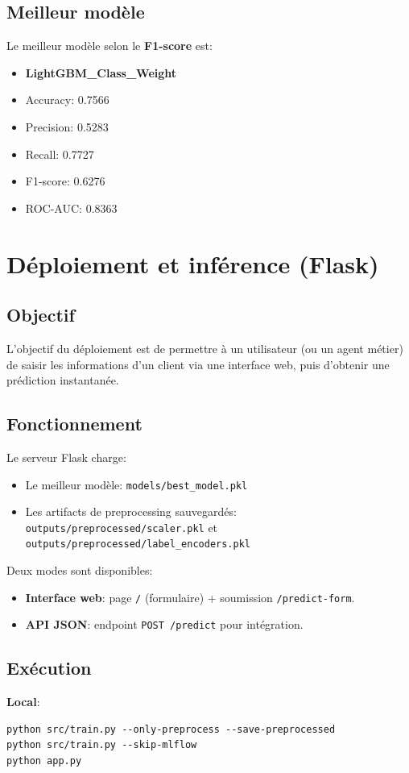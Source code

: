\documentclass[11pt,a4paper]{article}
\begin{document}
\subsection{Meilleur mod\`ele}
Le meilleur mod\`ele selon le \textbf{F1-score} est:
\begin{itemize}
  \item \textbf{LightGBM\_Class\_Weight}
  \item Accuracy: 0.7566
  \item Precision: 0.5283
  \item Recall: 0.7727
  \item F1-score: 0.6276
  \item ROC-AUC: 0.8363
\end{itemize}

\section{D\'eploiement et inf\'erence (Flask)}
\subsection{Objectif}
L'objectif du d\'eploiement est de permettre \`a un utilisateur (ou un agent m\'etier) de saisir les informations d'un client via une interface web, puis d'obtenir une pr\'ediction instantan\'ee.

\subsection{Fonctionnement}
Le serveur Flask charge:
\begin{itemize}
  \item Le meilleur mod\`ele: \texttt{models/best\_model.pkl}
  \item Les artifacts de preprocessing sauvegard\'es: \texttt{outputs/preprocessed/scaler.pkl} et \texttt{outputs/preprocessed/label\_encoders.pkl}
\end{itemize}

Deux modes sont disponibles:
\begin{itemize}
  \item \textbf{Interface web}: page \texttt{/} (formulaire) + soumission \texttt{/predict-form}.
  \item \textbf{API JSON}: endpoint \texttt{POST /predict} pour int\'egration.
\end{itemize}

\subsection{Ex\'ecution}
\textbf{Local}:
\begin{verbatim}
python src/train.py --only-preprocess --save-preprocessed
python src/train.py --skip-mlflow
python app.py
\end{verbatim}
\end{document}
